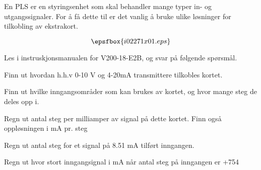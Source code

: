


En PLS er en styringsenhet som skal behandler mange typer in- og utgangssignaler. For {\aa} f{\aa} dette til er det vanlig {\aa} bruke ulike l{\o}sninger for tilkobling av ekstrakort. 

$$\epsfbox{i02271x01.eps}$$


Les i instruskjonsmanualen for V200-18-E2B, og svar p{\aa} f{\o}lgende sp{\o}rsm{\aa}l. 

\vskip 10pt

Finn ut hvordan h.h.v 0-10 V og 4-20mA transmittere tilkobles kortet. 

\vskip 10pt

Finn ut hvilke inngangsomr{\aa}der som kan brukes av kortet, og hvor mange steg de deles opp i. 

\vskip 10pt

Regn ut antal steg per milliamper av signal p{\aa} dette kortet. Finn ogs{\aa} oppl{\o}sningen i mA pr. steg

\vskip 10pt

Regn ut antal steg for et signal p{\aa} 8.51 mA tilf{\o}rt inngangen. 


\vskip 10pt


Regn ut hvor stort inngangsignal i mA n{\aa}r antal steg p{\aa} inngangen er +754


